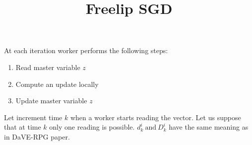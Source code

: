 \documentclass{article}
\date{}
\title{Freelip SGD}
\begin{document}
\maketitle
At each iteration worker performs the following steps: 

\begin{enumerate}
	\item Read master variable $z$
	\item Compute an update locally
	\item Update master variable $z$
\end{enumerate}

Let increment time $k$ when a worker starts reading the vector. Let us suppose that at time $k$ only one reading is possible. $d^i_k \ \text{and} \ D^i_k$ have the same meaning as in DaVE-RPG paper. 

\begin{theorem}
	
\end{theorem}
\end{document}
